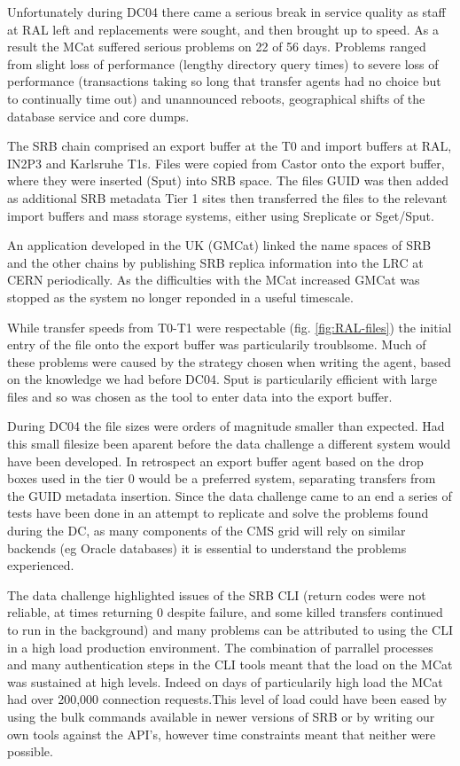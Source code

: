 \documentclass{cmspaper}
\begin{document}
Unfortunately during DC04 there came a serious break in service
quality as staff at RAL left and replacements were sought, and then
brought up to speed.  As a result the MCat suffered serious problems
on 22 of 56 days. Problems ranged from slight loss of performance
(lengthy directory query times) to severe loss of performance
(transactions taking so long that transfer agents had no choice but to
continually time out) and unannounced reboots, geographical shifts of
the database service and core dumps.

The SRB chain comprised an export buffer at the T0 and import buffers
at RAL, IN2P3 and Karlsruhe T1s. Files were copied from Castor onto
the export buffer, where they were inserted (Sput) into SRB space. The
files GUID was then added as additional SRB metadata Tier 1 sites then
transferred the files to the relevant import buffers and mass storage
systems, either using Sreplicate or Sget/Sput.

An application developed in the UK (GMCat) linked the name spaces of
SRB and the other chains by publishing SRB replica information into
the LRC at CERN periodically. As the difficulties with the MCat
increased GMCat was stopped as the system no longer reponded in a
useful timescale.


While transfer speeds from T0-T1 were respectable (fig. \ref{fig:RAL-files})
 the initial entry of the file onto the export buffer was
particularily troublsome.  Much of these problems were caused by the
strategy chosen when writing the agent, based on the knowledge we had
before DC04. Sput is particularily efficient with large files and so
was chosen as the tool to enter data into the export buffer.

During DC04 the file sizes were orders of magnitude smaller than
expected. Had this small filesize been aparent before the data
challenge a different system would have been developed. In retrospect
an export buffer agent based on the drop boxes used in the tier 0
would be a preferred system, separating transfers from the GUID
metadata insertion.  Since the data challenge came to an end a series
of tests have been done in an attempt to replicate and solve the
problems found during the DC, as many components of the CMS grid will
rely on similar backends (eg Oracle databases) it is essential to
understand the problems experienced.

The data challenge highlighted issues of the SRB CLI (return codes were not 
reliable, at times returning 0 despite failure, and some killed transfers continued to 
run in the background) and many problems can be attributed to using the CLI in
a high load production environment. The combination of parrallel processes and
many authentication steps in the CLI tools meant that the load on the MCat was 
sustained at high levels. Indeed on days of particularily high load the MCat
had over 200,000 connection requests.This level of load could have been 
eased by using the bulk commands available in newer versions of SRB or by 
writing our own tools against the API's, however time constraints meant that 
neither were possible.
\end{document}
